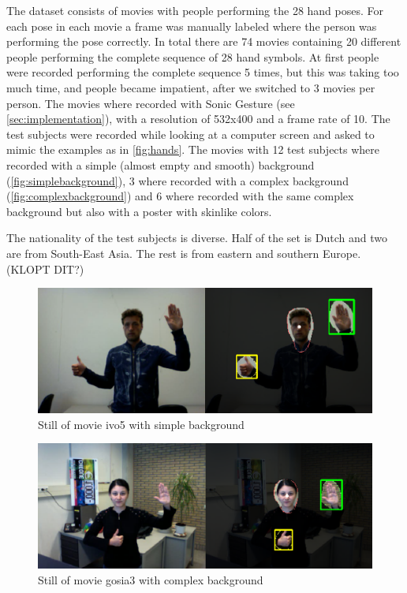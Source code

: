 The dataset consists of movies with people performing the 28 hand poses. For each pose in each movie a frame was manually labeled where the person was performing the pose correctly. In total there are 74 movies containing 20 different people performing the complete sequence of 28 hand symbols. At first people were recorded performing the complete sequence 5 times, but this was taking too much time, and people became impatient, after we switched to 3 movies per person. The movies where recorded with Sonic Gesture (see \autoref{sec:implementation}), with a resolution of 532x400 and a frame rate of 10. The test subjects were recorded while looking at a computer screen and asked to mimic the examples as in \autoref{fig:hands}. The movies with 12 test subjects where recorded with a simple (almost empty and smooth) background (\autoref{fig:simplebackground}), 3 where recorded with a complex background (\autoref{fig:complexbackground}) and 6 where recorded with the same complex background but also with a poster with skinlike colors.

The nationality of the test subjects is diverse. Half of the set is Dutch and two are from South-East Asia. The rest is from eastern and southern Europe. (KLOPT DIT?)

\begin{figure}[htbp]
\center{}
\includegraphics[width=0.8\linewidth]{figures/simple.png}
\caption{Still of movie ivo5 with simple background}
\label{fig:simplebackground}
\end{figure}

\begin{figure}[htbp]
\center{}
\includegraphics[width=0.8\linewidth]{figures/complex.png}
\caption{Still of movie gosia3 with complex background}
\label{fig:complexbackground}
\end{figure}

